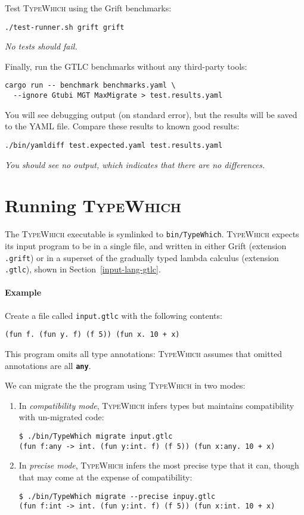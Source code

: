 \documentclass{article}
\newcommand{\system}{\textsc{TypeWhich}\xspace}
\newcommand{\kw}[1]{\textbf{\texttt{#1}}}
\begin{document}
Test \system using the Grift benchmarks:
\begin{verbatim}
./test-runner.sh grift grift
\end{verbatim}
\emph{No tests should fail.}

Finally, run the GTLC benchmarks without any third-party tools:
\begin{verbatim}
cargo run -- benchmark benchmarks.yaml \
  --ignore Gtubi MGT MaxMigrate > test.results.yaml
\end{verbatim}
You will see debugging output (on standard error), but the results will
be saved to the YAML file. Compare these results to known good results:
\begin{verbatim}
./bin/yamldiff test.expected.yaml test.results.yaml
\end{verbatim}
\emph{You should see no output, which indicates that there are no
differences.}

\section{Running \system}

The \system executable is symlinked to \texttt{bin/TypeWhich}. \system
expects its input program to be in a single file, and written in either
Grift (extension \texttt{.grift}) or in a superset of the 
gradually typed lambda calculus (extension \texttt{.gtlc}), shown in
Section~\ref{input-lang-gtlc}.

\paragraph{Example}
Create a file called \texttt{input.gtlc} with the following contents:

\begin{verbatim}
(fun f. (fun y. f) (f 5)) (fun x. 10 + x)
\end{verbatim}

This program omits all type annotations: \system assumes that omitted
annotations are all \kw{any}.

We can migrate the the program using \system in two modes:

\begin{enumerate}

\item In \emph{compatibility mode}, \system infers types but maintains
compatibility with un-migrated code:

\begin{verbatim}
$ ./bin/TypeWhich migrate input.gtlc
(fun f:any -> int. (fun y:int. f) (f 5)) (fun x:any. 10 + x)
\end{verbatim}

\item In \emph{precise mode}, \system infers the most precise type that it
can, though that may come at the expense of compatibility:

\begin{verbatim}
$ ./bin/TypeWhich migrate --precise inpuy.gtlc
(fun f:int -> int. (fun y:int. f) (f 5)) (fun x:int. 10 + x)
\end{verbatim}
     
\end{enumerate}
\end{document}
